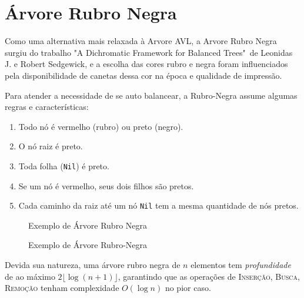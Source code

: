 \section{Árvore Rubro Negra}
\label{sec:rubro}

Como uma alternativa mais relaxada à Arvore AVL, a Arvore Rubro Negra surgiu do trabalho "A Dichromatic Framework for Balanced Trees"\ de Leonidas J. e Robert Sedgewick, e a escolha das cores rubro e negra foram influenciados pela disponibilidade de canetas dessa cor na época e qualidade de impressão.

Para atender a necessidade de se auto balancear, a Rubro-Negra assume algumas regras e características:

\begin{enumerate}
	\item Todo nó é vermelho (rubro) ou preto (negro).
	\item O nó raiz é preto.
	\item Toda folha (\texttt{Nil}) é preto.
	\item Se um nó é vermelho, seus dois filhos são pretos.
	\item Cada caminho da raiz até um nó \texttt{Nil} tem a mesma quantidade de nós pretos.
\end{enumerate}

\begin{figure}[!ht]
	\centering
	\caption{Exemplo de Árvore Rubro Negra}
	\caption{Exemplo de Árvore Rubro-Negra}
	\label{fig:rubro_example}
\end{figure}
\FloatBarrier


Devida sua natureza, uma árvore rubro negra de $n$ elementos tem \textit{profundidade} de ao máximo $2\lfloor\log (n + 1)\rfloor$, garantindo que as operações de \textrm{I\textsc{nserção}}, \textrm{B\textsc{usca}}, \textrm{R\textsc{emoção}} tenham complexidade $O(\log n)$ no pior caso.

